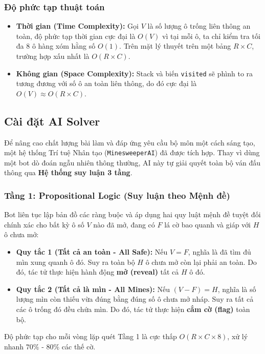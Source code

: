 \subsubsection{Độ phức tạp thuật toán}
\begin{itemize}
    \item \textbf{Thời gian (Time Complexity):} Gọi $V$ là số lượng ô trống liên thông an toàn, độ phức tạp thời gian cực đại là $O(V)$ vì tại mỗi ô, ta chỉ kiểm tra tối đa 8 ô hàng xóm hằng số $O(1)$. Trên mặt lý thuyết trên một bảng $R \times C$, trường hợp xấu nhất là $O(R \times C)$.
    \item \textbf{Không gian (Space Complexity):} Stack và biến \texttt{visited} sẽ phình to ra tương đương với số ô an toàn liên thông, do đó cực đại là $O(V) \approx O(R \times C)$.
\end{itemize}

\subsection{Cài đặt AI Solver}

Để nâng cao chất lượng bài làm và đáp ứng yêu cầu bộ môn một cách sáng tạo, một hệ thống Trí tuệ Nhân tạo (\texttt{MinesweeperAI}) đã được tích hợp. Thay vì dùng một bot dò đoán ngẫu nhiên thông thường, AI này tự giải quyết toàn bộ ván đấu thông qua \textbf{Hệ thống suy luận 3 tầng}.

\subsubsection{Tầng 1: Propositional Logic (Suy luận theo Mệnh đề)}
Bot liên tục lập bản đồ các ràng buộc và áp dụng hai quy luật mệnh đề tuyệt đối chính xác cho bất kỳ ô số $V$ nào đã mở, đang có $F$ lá cờ bao quanh và giáp với $H$ ô chưa mở:

\begin{itemize}
    \item \textbf{Quy tắc 1 (Tất cả an toàn - All Safe):} 
    Nếu $V = F$, nghĩa là đã tìm đủ mìn xung quanh ô đó. Suy ra toàn bộ $H$ ô chưa mở còn lại phải an toàn. Do đó, tác tử thực hiện hành động \textbf{mở (reveal)} tất cả $H$ ô đó.
    \item \textbf{Quy tắc 2 (Tất cả là mìn - All Mines):} 
    Nếu $(V - F) = H$, nghĩa là số lượng mìn còn thiếu vừa đúng bằng đúng số ô chưa mở nháp. Suy ra tất cả các ô trống đó đều chứa mìn. Do đó, tác tử thực hiện \textbf{cắm cờ (flag)} toàn bộ.
\end{itemize}
Độ phức tạp cho mỗi vòng lặp quét Tầng 1 là cực thấp $O(R \times C \times 8)$, xử lý nhanh $70\%$ - $80\%$ các thế cờ.

